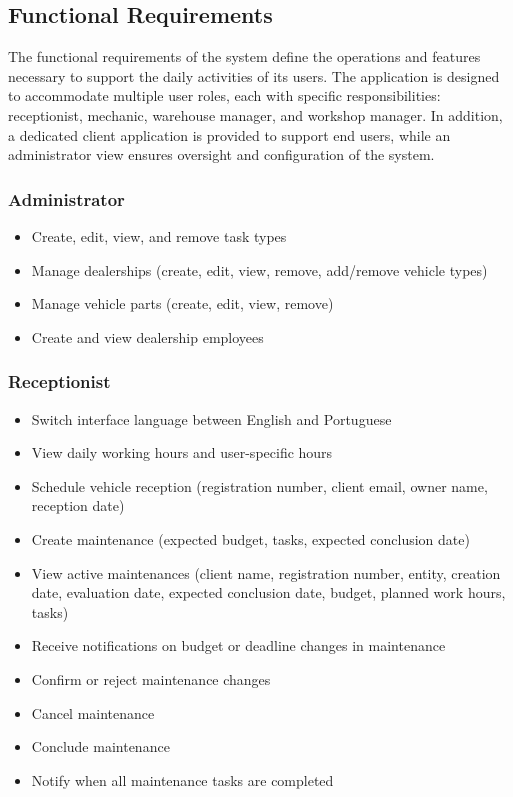 \subsection{Functional Requirements}
The functional requirements of the system define the operations and features necessary to support the daily activities of its users. The application is designed to accommodate multiple user roles, each with specific responsibilities: receptionist, mechanic, warehouse manager, and workshop manager. In addition, a dedicated client application is provided to support end users, while an administrator view ensures oversight and configuration of the system.

\subsubsection{Administrator}
\begin{itemize}
    \item Create, edit, view, and remove task types
    \item Manage dealerships (create, edit, view, remove, add/remove vehicle types)
    \item Manage vehicle parts (create, edit, view, remove)
    \item Create and view dealership employees
\end{itemize}

\subsubsection{Receptionist}
\begin{itemize}
    \item Switch interface language between English and Portuguese
    \item View daily working hours and user-specific hours
    \item Schedule vehicle reception (registration number, client email, owner name, reception date)
    \item Create maintenance (expected budget, tasks, expected conclusion date)
    \item View active maintenances (client name, registration number, entity, creation date, evaluation date, expected conclusion date, budget, planned work hours, tasks)
    \item Receive notifications on budget or deadline changes in maintenance
    \item Confirm or reject maintenance changes
    \item Cancel maintenance
    \item Conclude maintenance
    \item Notify when all maintenance tasks are completed
\end{itemize}

